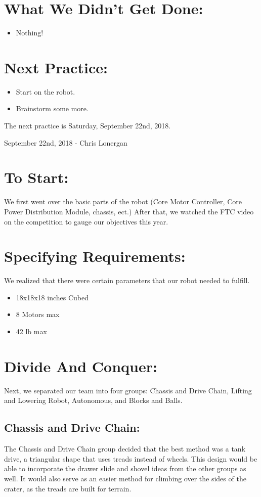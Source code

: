 \documentclass[12pt]{article}
\begin{document}
\section{What We Didn't Get Done:}
\begin{itemize}
	\item Nothing!
\end{itemize}



\section{Next Practice:}
\begin{itemize}
	\item Start on the robot.
	\item Brainstorm some more.
\end{itemize}

The next practice is Saturday, September 22nd, 2018.

\newpage
\setcounter{section}{0}

September 22nd, 2018 - Chris Lonergan

\section{To Start:}
We first went over the basic parts of the robot (Core Motor Controller, Core Power Distribution Module, chassis, ect.) After that, we watched the FTC video on the competition to gauge our objectives this year. 

\section{Specifying Requirements:}
We realized that there were certain parameters that our robot needed to fulfill. 
\begin{itemize}
	\item 18x18x18 inches Cubed
	\item 8 Motors max
	\item 42 lb max
\end{itemize}

\section{Divide And Conquer:}
Next, we separated our team into four groups: Chassis and Drive Chain, Lifting and Lowering Robot, Autonomous, and Blocks and Balls.

\subsection{Chassis and Drive Chain:}
The Chassis and Drive Chain group decided that the best method was a tank drive, a triangular shape that uses treads instead of wheels. 
This design would be able to incorporate the drawer slide and shovel ideas from the other groups as well. It would also serve as an easier method for climbing over the sides of the crater, as the treads are built for terrain.
\end{document}
